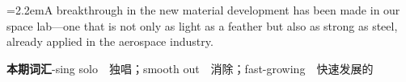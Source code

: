 \documentclass[11pt,a4paper]{article}
\newcommand{\num}[1]{\makebox[1.9em][r]{#1.}\hspace{0.3em}}
\begin{document}
\vspace{0.15em}

\noindent\hangindent=2.2em\hspace{2.2em}A breakthrough in the new material development has been made in our space lab—one that is not only as light as a feather but also as strong as steel, already applied in the aerospace industry.

\vspace{0.4em}\noindent{\color{rulegray}\rule{\textwidth}{0.6pt}}\vspace{0.4em}

\num{5}\textbf{本期词汇}\quad -sing solo　独唱；smooth out　消除；fast-growing　快速发展的
\end{document}

